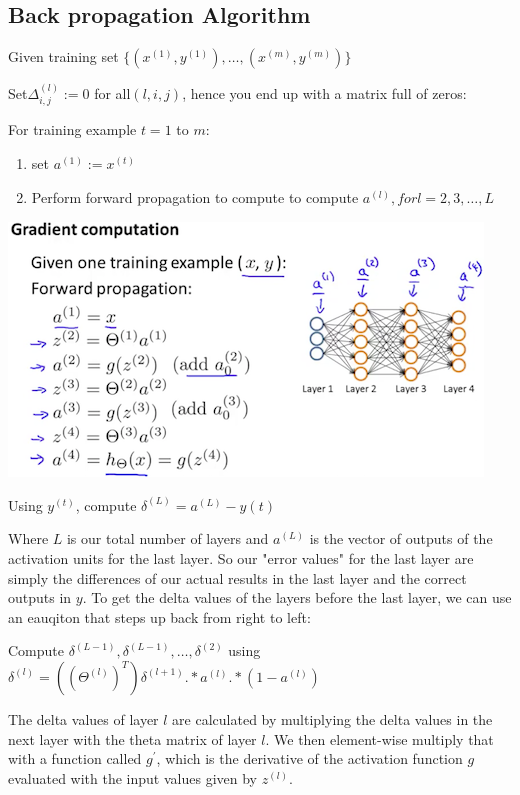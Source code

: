 \documentclass[10pt,a4paper,UTF8]{article}
\begin{document}
\subsection{Back propagation Algorithm}
\label{sec:orgf2b30ce}

Given training set \(\{(x^{(1)},y^{(1)}),\ldots , (x^{(m)},y^{(m)}) \}\)

Set\(\Delta_{i,j}^{(l)}:=0\) for all\((l,i,j)\), hence you end up with a matrix full of zeros:

For training example \(t=1\) to \(m\):
\begin{enumerate}
\item set \(a^{(1)}:=x^{(t)}\)
\item Perform forward propagation to compute to compute \(a^{(l)},for l = 2,3,\ldots ,L\)
\end{enumerate}

\begin{center}
\includegraphics[width=.9\linewidth]{../../img/computer_ng/20171014gradientComputation.png}
\end{center}

Using \(y^{(t)}\), compute \(\delta^{(L)} = a^{(L)} - y(t)\)

Where \(L\) is our total number of layers and \(a^{(L)}\) is the vector of outputs of the activation units for the last layer. So our "error values" for the last layer are simply the differences of our actual results in the last layer and the correct outputs in \(y\). To get the delta values of the layers before the last layer, we can use an eauqiton that steps up back from right to left:

Compute \(\delta^{(L-1)},\delta^{(L-1)},\ldots ,\delta^{(2)}\) using \(\delta^{(l)} = ((\Theta^{(l)})^{T})\delta^{(l+1)}.* a^{(l)} .* (1-a^{(l)})\)

The delta values of layer \(l\) are calculated by multiplying the delta values in the next layer with the theta matrix of layer \(l\). We then element-wise multiply that with a function called \(g^{'}\), which is the derivative of the activation function \(g\) evaluated with the input values given by \(z^{(l)}\).
\end{document}
